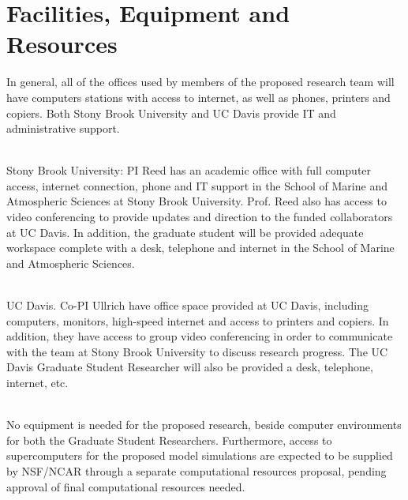 \documentclass[11pt]{article}
\begin{document}
\setcounter{section}{2}

\appendix

\setcounter{section}{8}

\section{Facilities, Equipment and Resources}

In general, all of the offices used by members of the proposed research team will have computers stations with access to internet, as well as phones, printers and copiers. Both Stony Brook University and UC Davis provide IT and administrative support.

\ \\

\noindent Stony Brook University: PI Reed has an academic office with full computer access, internet connection, phone and IT support in the School of Marine and Atmospheric Sciences at Stony Brook University. Prof. Reed also has access to video conferencing to provide updates and direction to the funded collaborators at UC Davis. In addition, the graduate student will be provided adequate workspace complete with a desk, telephone and internet in the School of Marine and Atmospheric Sciences. 

\ \\

\noindent UC Davis. Co-PI Ullrich have office space provided at UC Davis, including computers, monitors, high-speed internet and access to printers and copiers. In addition, they have access to group video conferencing in order to communicate with the team at Stony Brook University to discuss research progress.  The UC Davis Graduate Student Researcher will also be provided a desk, telephone, internet, etc.

\ \\

\noindent No equipment is needed for the proposed research, beside computer environments for both the Graduate Student Researchers. Furthermore, access to supercomputers for the proposed model simulations are expected to be supplied by NSF/NCAR through a separate computational resources proposal, pending approval of final computational resources needed.
\end{document}
